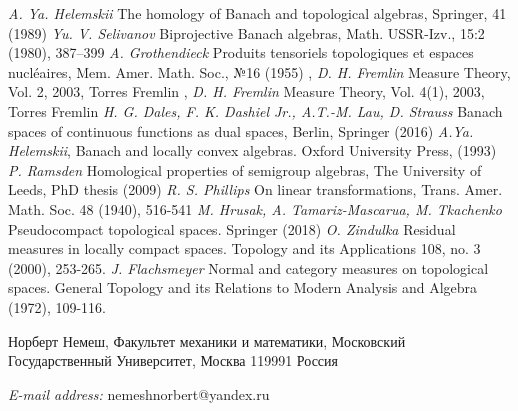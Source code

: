 \documentclass[12pt]{article}
\begin{document}
\begin{thebibliography}{999}
    \textit{A. Ya. Helemskii} The homology of Banach and topological algebras, Springer, 41 (1989)
    \textit{Yu. V. Selivanov} Biprojective Banach algebras, Math. USSR-Izv., 15:2 (1980), 387–399
    \textit{A. Grothendieck} Produits tensoriels topologiques et espaces nucl{\'e}aires, Mem. Amer. Math. Soc., №16 (1955)
    ,
    \textit{D. H. Fremlin} Measure Theory, Vol. 2, {2003}, Torres Fremlin
    ,
    \textit{D. H. Fremlin} Measure Theory, Vol. 4(1), {2003}, Torres Fremlin
    \textit{H. G. Dales, F. K. Dashiel Jr., A.T.-M. Lau, D. Strauss} Banach spaces of continuous functions as dual spaces, Berlin, Springer (2016)
    \textit{A.Ya. Helemskii}, Banach and locally convex algebras. Oxford University Press, (1993)
    \textit{P. Ramsden} Homological properties of semigroup algebras, The University of Leeds, PhD thesis (2009)
    \textit{R. S. Phillips} On linear transformations, Trans. Amer. Math. Soc. 48 (1940), 516-541
    \textit{M. Hrusak, A. Tamariz-Mascarua, M. Tkachenko} Pseudocompact topological spaces. Springer (2018)
    \textit{O. Zindulka} Residual measures in locally compact spaces. Topology and its Applications 108, no. 3 (2000), 253-265.
    \textit{J. Flachsmeyer} Normal and category measures on topological spaces. General Topology and its Relations to Modern Analysis and Algebra (1972), 109-116.
\end{thebibliography}

Норберт Немеш, Факультет механики и математики, Московский Государственный Университет, Москва 119991 Россия

\textit{E-mail address:} nemeshnorbert@yandex.ru
\end{document}
